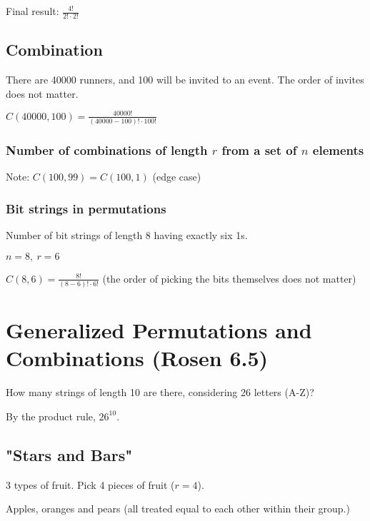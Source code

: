 \documentclass[english,openany]{book}
\begin{document}
    Final result: $\frac{4!}{2! \cdot 2!}$\\

    \subsection{Combination}

    There are 40000 runners, and 100 will be invited to an event. The order of invites does not matter.

    $C(40000,100) = \frac{40000!}{(40000 - 100)! \cdot 100!}$\\

    \subsubsection{Number of combinations of length $r$ from a set of $n$ elements}
        \noindent{}
    Note: $C(100,99) = C(100,1)$ (edge case)\\

    \subsubsection{Bit strings in permutations}

    Number of bit strings of length 8 having exactly six 1s.

    $n = 8,\ r = 6$

    $C(8,6) = \frac{8!}{(8-6)! \cdot 6!}$ (the order of picking the bits themselves does not matter)

    \newpage
    \section{Generalized Permutations and Combinations (Rosen 6.5)}

    How many strings of length 10 are there, considering 26 letters (A-Z)?

    By the product rule, $26^{10}$.\\

    \subsection{"Stars and Bars"}

    3 types of fruit. Pick 4 pieces of fruit ($r=4$).

    Apples, oranges and pears (all treated equal to each other within their group.)
\end{document}
